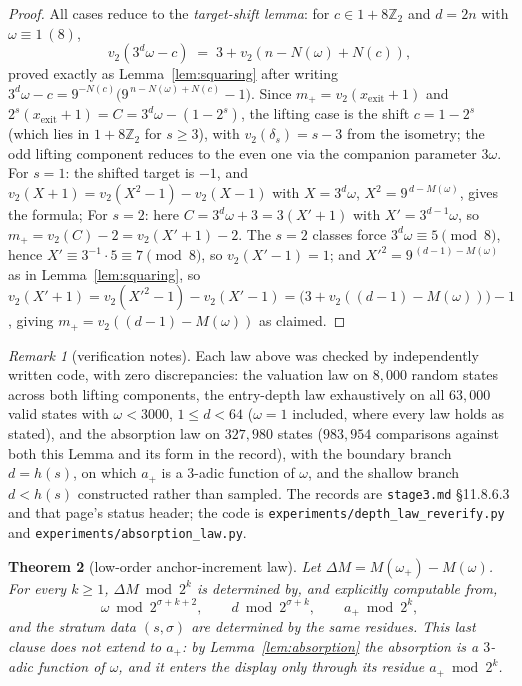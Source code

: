 \documentclass[11pt]{article}
\newtheorem{theorem}{Theorem}[section]
\theoremstyle{remark}
\newtheorem{remark}[theorem]{Remark}
\newcommand{\Z}{\mathbb{Z}}
\newcommand{\vt}[1]{v_2\!\left(#1\right)}
\newcommand{\w}{\omega}
\newcommand{\wnext}{\w_{+}}
\begin{document}
\begin{proof}
All cases reduce to the \emph{target-shift lemma}: for $c \in 1 + 8\Z_2$ and $d = 2n$ with $\w \equiv 1\ (8)$,
\[ \vt{3^{d}\w - c} \;=\; 3 + \vt{n - N(\w) + N(c)}, \]
proved exactly as Lemma~\ref{lem:squaring} after writing $3^d\w - c = 9^{-N(c)}\bigl(9^{\,n - N(\w) + N(c)} - 1\bigr)$. Since $m_+ = \vt{x_{\mathrm{exit}}+1}$ and $2^s(x_{\mathrm{exit}}+1) = C = 3^d\w - (1 - 2^s)$, the lifting case is the shift $c = 1 - 2^s$ (which lies in $1+8\Z_2$ for $s \ge 3$), with $\vt{\delta_s} = s - 3$ from the isometry; the odd lifting component reduces to the even one via the companion parameter $3\w$. For $s = 1$: the shifted target is $-1$, and $\vt{X+1} = \vt{X^2-1} - \vt{X-1}$ with $X = 3^d\w$, $X^2 = 9^{\,d - M(\w)}$, gives the formula; For $s = 2$: here $C = 3^d\w + 3 = 3(X' + 1)$ with $X' = 3^{d-1}\w$, so $m_+ = \vt{C} - 2 = \vt{X'+1} - 2$. The $s=2$ classes force $3^d\w \equiv 5 \pmod 8$, hence $X' \equiv 3^{-1}\cdot 5 \equiv 7 \pmod 8$, so $\vt{X'-1} = 1$; and $X'^2 = 9^{\,(d-1) - M(\w)}$ as in Lemma~\ref{lem:squaring}, so $\vt{X'+1} = \vt{X'^2-1} - \vt{X'-1} = \bigl(3 + \vt{(d-1) - M(\w)}\bigr) - 1$, giving $m_+ = \vt{(d-1) - M(\w)}$ as claimed.
\end{proof}

\begin{remark}[verification notes]\label{rem:verify1}
Each law above was checked by independently written code, with zero discrepancies: the valuation law on $8{,}000$ random states across both lifting components, the entry-depth law exhaustively on all $63{,}000$ valid states with $\w < 3000$, $1 \le d < 64$ ($\w = 1$ included, where every law holds as stated), and the absorption law on $327{,}980$ states ($983{,}954$ comparisons against both this Lemma and its form in the record), with the boundary branch $d = h(s)$, on which $a_+$ is a $3$-adic function of $\w$, and the shallow branch $d < h(s)$ constructed rather than sampled. The records are \texttt{stage3.md} \S11.8.6.3 and that page's status header; the code is \texttt{experiments/depth\_law\_reverify.py} and \texttt{experiments/absorption\_law.py}.
\end{remark}

\begin{theorem}[low-order anchor-increment law]\label{thm:deltaM}
Let $\Delta M = M(\wnext) - M(\w)$. For every $k \ge 1$, $\Delta M \bmod 2^k$ is determined by, and explicitly computable from,
\[ \w \bmod 2^{\sigma + k + 2},\qquad d \bmod 2^{\sigma + k},\qquad a_+ \bmod 2^k, \]
and the stratum data $(s, \sigma)$ are determined by the same residues. This last clause does not extend to $a_+$: by Lemma~\ref{lem:absorption} the absorption is a $3$-adic function of $\w$, and it enters the display only through its residue $a_+ \bmod 2^k$.
\end{theorem}
\end{document}
